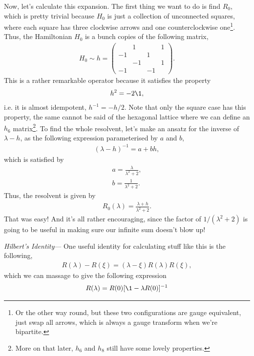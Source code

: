 \documentclass[11pt, oneside]{article} %
\numberwithin{equation}{section}
\begin{document}
Now, let's calculate this expansion. The first thing we want to do is find $R_0$, which is pretty trivial because $H_0$ is just a collection of unconnected squares, where each square has three clockwise arrows and one counterclockwise one\footnote{Or the other way round, but these two configurations are gauge equivalent, just swap all arrows, which is always a gauge transform when we're bipartite.}. Thus, the Hamiltonian $H_0$ is a bunch copies of the following matrix,
\begin{align}
    H_0 \sim h = \begin{pmatrix}
         & 1 &  & 1 \\
        -1 &  & 1 &  \\
         & -1 &  & 1 \\
        -1 &  & -1 &  
    \end{pmatrix}.
\end{align}
This is a rather remarkable operator because it satisfies the property
\begin{align}
    h^2  = -2 \1,
\end{align}
i.e. it is almost idempotent, $h^{-1} = -h/2$. Note that only the square case has this property, the same cannot be said of the hexagonal lattice where we can define an $h_6$ matrix\footnote{More on that later, $h_6$ and $h_8$ still have some lovely properties.}. To find the whole resolvent, let's make an ansatz for the inverse of $\lambda - h$, as the following expression parameterised by $a$ and $b$,
\begin{align}
    \left (
        \lambda - h
    \right )^{-1} = 
        a + bh,
\end{align}
which is satisfied by
\begin{align}
    a = \frac{\lambda}{\lambda^2+2}, \\
    b = \frac{1}{\lambda^2+2}.
\end{align}
Thus, the resolvent is given by 
\begin{align}
    R_0(\lambda) = \frac{\lambda + h }{\lambda^2 + 2}.
\end{align}
That was easy! And it's all rather encouraging, since the factor of $1/(\lambda^2 + 2)$ is going to be useful in making sure our infinite sum doesn't blow up!

\begin{shaded}
\textit{Hilbert's Identity}---%
One useful identity for calculating stuff like this is the following,
\begin{align}
    R(\lambda) - R(\xi) = (\lambda - \xi)R(\lambda) R(\xi), 
\end{align}
which we can massage to give the following expression
\begin{align}
    R(\lambda)  = R(0) [\1  -\lambda R(0) ]^{-1}
\end{align}


\end{shaded}
\end{document}
